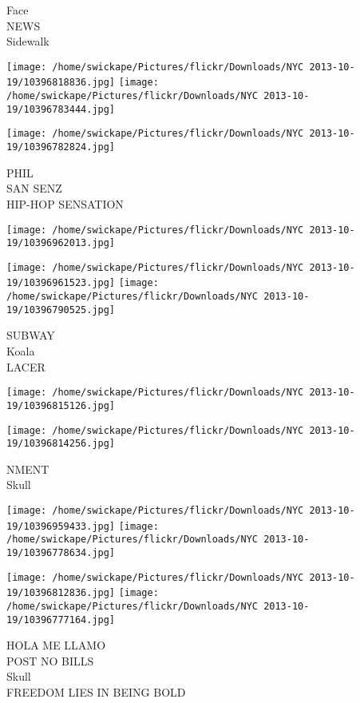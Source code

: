 \documentclass[10pt,letterpaper]{article}
\begin{document}
Face\\
NEWS\\
Sidewalk\\
\pagebreak

\texttt{[image: /home/swickape/Pictures/flickr/Downloads/NYC 2013-10-19/10396818836.jpg]}
\texttt{[image: /home/swickape/Pictures/flickr/Downloads/NYC 2013-10-19/10396783444.jpg]}

\texttt{[image: /home/swickape/Pictures/flickr/Downloads/NYC 2013-10-19/10396782824.jpg]}

PHIL\\
SAN SENZ\\
HIP{-}HOP SENSATION\\
\pagebreak

\texttt{[image: /home/swickape/Pictures/flickr/Downloads/NYC 2013-10-19/10396962013.jpg]}

\vspace{0.25in}
\texttt{[image: /home/swickape/Pictures/flickr/Downloads/NYC 2013-10-19/10396961523.jpg]}
\texttt{[image: /home/swickape/Pictures/flickr/Downloads/NYC 2013-10-19/10396790525.jpg]}

SUBWAY\\
Koala\\
LACER\\
\pagebreak

\texttt{[image: /home/swickape/Pictures/flickr/Downloads/NYC 2013-10-19/10396815126.jpg]}

\vspace{0.25in}
\texttt{[image: /home/swickape/Pictures/flickr/Downloads/NYC 2013-10-19/10396814256.jpg]}

NMENT\\
Skull\\
\pagebreak

\texttt{[image: /home/swickape/Pictures/flickr/Downloads/NYC 2013-10-19/10396959433.jpg]}
\texttt{[image: /home/swickape/Pictures/flickr/Downloads/NYC 2013-10-19/10396778634.jpg]}

\texttt{[image: /home/swickape/Pictures/flickr/Downloads/NYC 2013-10-19/10396812836.jpg]}
\texttt{[image: /home/swickape/Pictures/flickr/Downloads/NYC 2013-10-19/10396777164.jpg]}

HOLA ME LLAMO\\
POST NO BILLS\\
Skull\\
FREEDOM LIES IN BEING BOLD\\
\pagebreak
\end{document}
